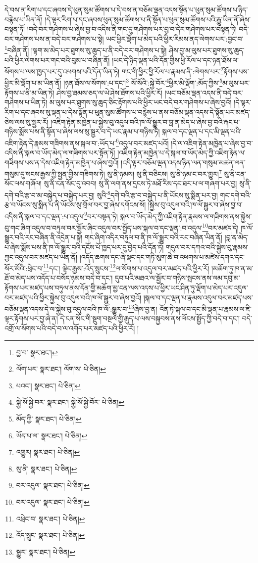 དེ་བས་ན་རིག་པ་དང་ཞབས་དེ་ཕུན་སུམ་ཚོགས་པ་དེ་བས་ན་བཅོམ་ལྡན་འདས་སྟོན་པ་ཕུན་སུམ་ཚོགས་པ་ཉིད་བརྙེས་པ་ཡིན་ནོ། །དེ་ལྟར་རིག་པ་དང་ཞབས་ཕུན་སུམ་ཚོགས་པ་ནི་སྟོན་པ་ཕུན་སུམ་ཚོགས་པའི་རྒྱུ་ཡིན་ནོ་ཞེས་བསྟན་ཏོ། །བདེ་བར་གཤེགས་པ་ཞེས་བྱ་བ་འདིས་ནི་གང་དུ་གཤེགས་པར་བྱ་བ་དེར་གཤེགས་པར་བསྟན་ཏེ། བདེ་བར་གཤེགས་པས་ན་བདེ་བར་གཤེགས་པ་སྟེ། ཡང་ཕྱིར་ལྡོག་པ་མེད་པའི་ཕྱིར་རིམས་ནད་ལེགས་པར་:བྱང་བ་\footnote{བྱ་བ་  སྣར་ཐང་། }བཞིན་ནོ། །ལྷག་མ་མེད་པར་ཐུགས་སུ་ཆུད་པ་ནི་བདེ་བར་གཤེགས་པ་སྟེ། ཤེས་བྱ་མ་ལུས་པར་ཐུགས་སུ་ཆུད་པའི་ཕྱིར་ལེགས་པར་གང་བའི་བུམ་པ་བཞིན་ནོ། །ཡང་དེ་ཉིད་ལྡན་པའི་དོན་གྱིས་ཕྱི་རོལ་པ་དང་ཉན་ཐོས་ལ་སོགས་པ་ལས་ཁྱད་པར་དུ་འཕགས་པའི་དོན་ཡིན་ཏེ། གང་གི་ཕྱིར་ཕྱི་རོལ་པ་རྣམས་ནི་:ལེགས་པར་\footnote{ལོག་པར་  སྣར་ཐང་། ལོག་ས་  པེ་ཅིན། }རྟོགས་པས་ཕྱིར་མི་ལྡོག་པ་མ་ཡིན་ནོ། །ཉན་ཐོས་ལ་སོགས་:པ་དང་།\footnote{པའང་།  སྣར་ཐང་།  པེ་ཅིན། } སོ་སོའི་:སྐྱེ་བོར་\footnote{སྐྱེ་སོ་སྐྱེ་བར་  སྣར་ཐང་། སྐྱེ་སོ་སྐྱེ་བོར་  པེ་ཅིན། }ཕྱིར་མི་ལྡོག་:མོད་ཀྱིས་\footnote{མོད་ཀྱི་  སྣར་ཐང་།  པེ་ཅིན། }མ་ལུས་པར་རྟོགས་པ་ནི་མ་ཡིན་ཏེ། ཤེས་བྱ་ཐམས་ཅད་ལ་ཡེ་ཤེས་ཐོགས་པའི་ཕྱིར་རོ། །ཡང་བཅོམ་ལྡན་འདས་ནི་བདེ་བར་གཤེགས་པ་ཡིན་ཏེ། མ་ལུས་པར་ཐུགས་སུ་ཆུད་ཅིང་རྟོགས་པའི་ཕྱིར་ཡང་བདེ་བར་གཤེགས་པ་ཞེས་བྱའོ། །དེ་ལྟར་རིག་པ་དང་ཞབས་སུ་ལྡན་པ་དེས་སྟོན་པ་ཕུན་སུམ་ཚོགས་པ་བརྙེས་པ་ནས་བཅོམ་ལྡན་འདས་དེ་སྟོན་པར་མཛད་ཅེས་ལས་སུ་སྦྱར་རོ། །འཇིག་རྟེན་མཁྱེན་པ་སྐྱེས་བུ་འདུལ་བའི་ཁ་ལོ་སྒྱུར་བ་བླ་ན་མེད་པ་ཞེས་བྱ་བའི་རྐང་པ་གཉིས་སྨོས་པས་ནི་སྟོན་པ་ཞེས་ལས་སུ་སྦྱར་བ་དེ་ཡང་རྣམ་པ་གཉིས་ཏེ། སྐལ་བ་དང་ལྡན་པ་དང་མི་ལྡན་པའི་འཇིག་རྟེན་དེ་རྣམས་གཟིགས་ནས་སྐལ་བ་:ཡོད་པ་\footnote{ཡོད་པ་ལ་  སྣར་ཐང་།  པེ་ཅིན། }འདུལ་བར་མཛད་པའོ། །དེ་ལ་འཇིག་རྟེན་མཁྱེན་པ་ཞེས་བྱ་བ་འདིས་ནི་སྐལ་བ་ཡོད་མེད་ལ་གཟིགས་པར་སྟོན་ཏོ། །འཇིག་རྟེན་མཁྱེན་པ་དེ་སྐལ་བ་ཡོད་མེད་ཀྱི་འཇིག་རྟེན་ལ་གཟིགས་པས་ན་དེས་འཇིག་རྟེན་མཁྱེན་པ་ཞེས་བྱའོ། །འདི་ལྟར་བཅོམ་ལྡན་འདས་ཉིན་ལན་གསུམ་མཚན་ལན་གསུམ་དུ་སངས་རྒྱས་ཀྱི་སྤྱན་གྱིས་གཟིགས་ཏེ། སུ་ནི་ཉམས། སུ་ནི་བཅིངས། སུ་ནི་ཉམ་ང་བར་གྱུར།\footnote{འགྱུར།  སྣར་ཐང་།  པེ་ཅིན། } སུ་ནི་ངན་སོང་ལས་གཞོལ། སུ་ནི་ངན་སོང་དུ་འབབ། སུ་ནི་ལག་ནས་དྲངས་ཏེ་མཐོ་རིས་དང་ཐར་པ་ལ་གཞག་པར་བྱ། སུ་ནི་དགེ་བའི་རྩ་བ་མ་བསྐྱེད་པ་བསྐྱེད་པར་བྱ། སུའི་\footnote{སུ་ནི་  སྣར་ཐང་།  པེ་ཅིན། }དགེ་བའི་རྩ་བ་བསྐྱེད་པ་ནི་ཡོངས་སུ་སྨིན་པར་བྱ། གང་དགེ་བའི་རྩ་བ་ཡོངས་སུ་སྨིན་པ་ནི་ཡོངས་སུ་གྲོལ་བར་བྱ་ཞེས་དགོངས་སོ། །སྐྱེས་བུ་འདུལ་བའི་ཁ་ལོ་སྒྱུར་བ་ཞེས་བྱ་བ་འདིས་ནི་སྐལ་བ་དང་ལྡན་:པ་འདུལ་\footnote{བར་འདུལ་  སྣར་ཐང་།  པེ་ཅིན། }བར་བསྟན་ཏེ། སྐལ་བ་ཡོད་མེད་ཀྱི་འཇིག་རྟེན་རྣམས་ལ་གཟིགས་ནས་སྐྱེས་བུ་གང་ཞིག་འདུལ་བ་བཏུལ་བར་སྦྱོར་ཞིང་འདུལ་བར་སྤྱོད་པས་སྐལ་བ་དང་ལྡན་:བ་འདུལ་\footnote{བར་འདུལ་  སྣར་ཐང་།  པེ་ཅིན། }བར་མཛད་དེ། ཁ་ལོ་སྒྱུར་བའི་རང་བཞིན་ནི་འདྲེན་པ་སྟེ། གང་ཞིག་འདིར་བཏུལ་བ་ནི་ཁ་ལོ་སྒྱུར་བའི་རང་བཞིན་ཡིན་ནོ། །བླ་ན་མེད་པ་ཞེས་སྨོས་པས་ནི་ཁ་ལོ་སྒྱུར་བའི་དངོས་པོ་ཁྱད་པར་དུ་བྱེད་པའི་དོན་ཏེ། གདུལ་བར་དཀའ་བའི་སྐྱེས་བུ་རྣམས་ཀྱང་འདུལ་བར་མཛད་པ་ཡིན་ནོ། །འདོད་ཆགས་དང་ཞེ་སྡང་དང་གཏི་མུག་ཆེ་བ་འཕགས་པ་མཛེས་དགའ་དང་སོར་མོའི་:ཕྲེང་བ་\footnote{འཕྲེང་བ་  སྣར་ཐང་།  པེ་ཅིན། }དང་། ལྟེང་རྒྱས་:འོད་སྲུངས་\footnote{འོད་སྲུང་  སྣར་ཐང་།  པེ་ཅིན། }ལ་སོགས་པ་འདུལ་བར་མཛད་པའི་ཕྱིར་རོ། །མཆོག་ཏུ་ཁ་ན་མ་ཐོ་བ་མེད་པས་འདོད་པ་བསོད་ཉམས་བདེ་བ་དང་། དུབ་པའི་མཐའ་ལ་སྦྱོར་བ་གཉིས་སྤངས་ནས་ལམ་དབུ་མ་རྟོགས་པར་མཛད་པས་བཏུལ་ནས་དོན་གྱི་མཆོག་མྱ་ངན་ལས་འདས་པ་ཕྱིར་ཡང་ཤིན་ཏུ་ལྡོག་པ་མེད་པར་འདུལ་བར་མཛད་པའི་ཕྱིར་སྐྱེས་བུ་འདུལ་བའི་ཁ་ལོ་སྒྱུར་བ་ཞེས་བྱའོ། །སྐལ་བ་དང་ལྡན་པ་རྣམས་འདུལ་བར་མཛད་པས་བཅོམ་ལྡན་འདས་དེ་ལ་སྐྱེས་བུ་འདུལ་བའི་ཁ་ལོ་:སྒྱུར་བ་\footnote{སྒྱུར་  སྣར་ཐང་།  པེ་ཅིན། }ཞེས་བྱ་ན། འོན་ཏེ་སྐལ་བ་དང་མི་ལྡན་པ་རྣམས་ལ་ཇི་ལྟར་རྟོགས་པར་བྱ་ཞེ་ན། དེ་ངན་སོང་གི་སྡུག་བསྔལ་གྱི་རྒུད་པ་ལས་བསྐྱབས་ནས་ལོངས་སྤྱོད་ཀྱི་བདེ་བ་དང་། བདེ་འགྲོ་ལ་སོགས་པའི་བདེ་བ་ལ་འགོད་པར་མཛད་པའི་ཕྱིར་རོ། །

